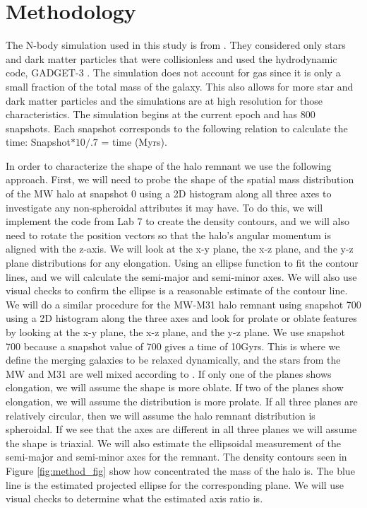 \documentclass[linenumbers, twocolumn]{aastex631}
\begin{document}
\section{Methodology} \label{sec:methodology}

The N-body simulation used in this study is from \cite{2012VanDerMarel}. They considered only stars and dark matter particles that were collisionless and used the hydrodynamic code, GADGET-3 \cite{}. The simulation does not account for gas since it is only a small fraction of the total mass of the galaxy. This also allows for more star and dark matter particles and the simulations are at high resolution for those characteristics. The simulation begins at the current epoch and has 800 snapshots. Each snapshot corresponds to the following relation to calculate the time: Snapshot$*10/.7$ = time (Myrs).

In order to characterize the shape of the halo remnant we use the following approach.
First, we will need to probe the shape of the spatial mass distribution of the MW halo at snapshot 0 using a 2D histogram along all three axes to investigate any non-spheroidal attributes it may have. To do this, we will implement the code from Lab 7 to create the density contours, and we will also need to rotate the position vectors so that the halo's angular momentum is aligned with the z-axis. We will look at the x-y plane, the x-z plane, and the y-z plane distributions for any elongation. Using an ellipse function to fit the contour lines, and we will calculate the semi-major and semi-minor axes. We will also use visual checks to confirm the ellipse is a reasonable  estimate of the contour line.
We will do a similar procedure for the MW-M31 halo remnant using snapshot 700 using a 2D histogram along the three axes and look for prolate or oblate features by looking at the x-y plane, the x-z plane, and the y-z plane. We use snapshot 700 because a snapshot value of 700 gives a time of 10Gyrs. This is where we define the merging galaxies to be relaxed dynamically, and the stars from the MW and M31 are well mixed according to \cite{2012VanDerMarel}. If only one of the planes shows elongation, we will assume the shape is more oblate. If two of the planes show elongation, we will assume the distribution is more prolate. If all three planes are relatively circular, then we will assume the halo remnant distribution is spheroidal. If we see that the axes are different in all three planes we will assume the shape is triaxial. We will also estimate the ellipsoidal measurement of the semi-major and semi-minor axes for the remnant.
The density contours seen in Figure \ref{fig:method_fig} show how concentrated the mass of the halo is. The blue line is the estimated projected ellipse for the corresponding plane. We will use visual checks to determine what the estimated axis ratio is.
\end{document}
